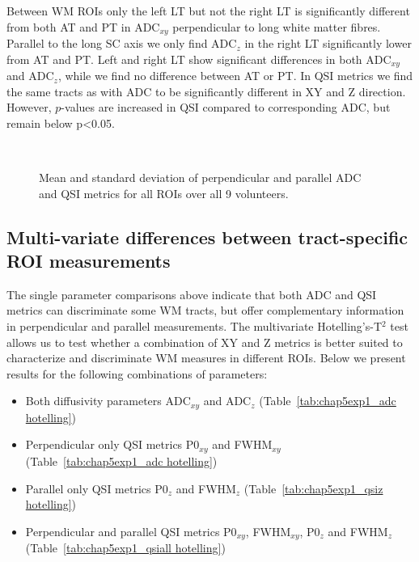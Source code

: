 Between \gls{WM} \glspl{ROI} only the left LT but not the right LT is significantly different from both AT and PT in ADC$_{xy}$ perpendicular to long white matter fibres. Parallel to the long \gls{SC} axis we only find ADC$_{z}$ in the right LT significantly lower from AT and PT. Left and right LT show significant differences in both ADC$_{xy}$ and ADC$_{z}$, while we find no difference between AT or PT. In \gls{QSI} metrics we find the same tracts as with ADC to be significantly different in XY and Z direction. However, $p$-values are increased in \gls{QSI} compared to corresponding ADC, but remain below p<0.05.%
\begin{figure}[h!tp]
	\\
   \caption{Mean and standard deviation of perpendicular and parallel ADC and QSI metrics for all ROIs over all 9 volunteers.}
   \label{fig:chapter5 exp1 vals}	
\end{figure}

\subsection{Multi-variate differences between tract-specific ROI measurements}
The single parameter comparisons above indicate that both \gls{ADC} and \gls{QSI} metrics can discriminate some WM tracts, but offer complementary information in perpendicular and parallel measurements. The multivariate Hotelling's-T$^2$ test allows us to test whether a combination of XY and Z metrics is better suited to characterize and discriminate \gls{WM} measures in different \glspl{ROI}. Below we present results for the following combinations of parameters:
\begin{itemize}
    \item Both diffusivity parameters ADC$_{xy}$ and ADC$_z$ (Table~\ref{tab:chap5exp1_adc hotelling})
    \item Perpendicular only \gls{QSI} metrics P0$_{xy}$ and FWHM$_{xy}$ (Table~\ref{tab:chap5exp1_adc hotelling})
    \item Parallel only \gls{QSI} metrics P0$_z$ and FWHM$_z$ (Table~\ref{tab:chap5exp1_qsiz hotelling})
    \item Perpendicular and parallel \gls{QSI} metrics P0$_{xy}$, FWHM$_{xy}$, P0$_z$ and FWHM$_z$ (Table~\ref{tab:chap5exp1_qsiall hotelling})
\end{itemize}


